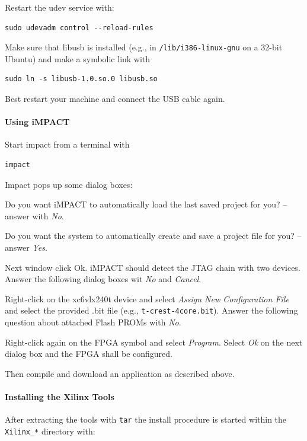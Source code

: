 \documentclass[a4paper,fontsize=10pt,twoside,DIV15,BCOR12mm,headinclude=true,footinclude=false,pagesize,bibtotoc]{scrbook}
\newcommand{\code}[1]{{\texttt{#1}}}
\begin{document}
Restart the udev service with:

\begin{verbatim} 
sudo udevadm control --reload-rules
\end{verbatim}

Make sure that libusb is installed (e.g., in \code{/lib/i386-linux-gnu} on a 32-bit Ubuntu) and make a symbolic link with

\begin{verbatim} 
sudo ln -s libusb-1.0.so.0 libusb.so
\end{verbatim}

Best restart your machine and connect the USB cable again.

\paragraph{Using iMPACT}

Start impact from a terminal with 

\begin{verbatim} 
impact
\end{verbatim}

Impact pops up some dialog boxes:

Do you want iMPACT to automatically load the last saved project for you? -- answer with \emph{No}.

Do you want the system to automatically create and save a project file for you? -- answer \emph{Yes}.

Next window click Ok. iMPACT should detect the JTAG chain with two devices. Answer the
following dialog boxes wit \emph{No} and \emph{Cancel}.

Right-click on the xc6vlx240t device and select \emph{Assign New Configuration File} and select
the provided .bit file (e.g., \code{t-crest-4core.bit}). Answer the following question about attached
Flash PROMs with \emph{No}.

Right-click again on the FPGA symbol and select \emph{Program}. Select \emph{Ok} on the next
dialog box and the FPGA shall be configured.

Then compile and download an application as described above.

\paragraph{Installing the Xilinx Tools}

After extracting the tools with \code{tar} the install procedure is started within the
\code{Xilinx\_*} directory with:
\end{document}

